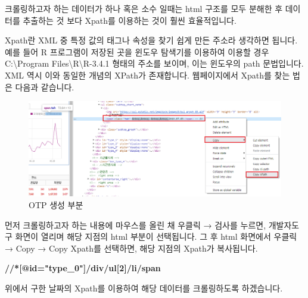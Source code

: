 \documentclass[12pt,]{book}
\newenvironment{Shaded}{\begin{snugshade}}{\end{snugshade}}
\newcommand{\ErrorTok}[1]{\textcolor[rgb]{0.64,0.00,0.00}{\textbf{#1}}}
\begin{document}
크롤링하고자 하는 데이터가 하나 혹은 소수 일때는 html 구조를 모두 분해한 후 데이터를 추출하는 것 보다 Xpath를 이용하는 것이 훨씬 효율적입니다.

Xpath란 XML 중 특정 값의 태그나 속성을 찾기 쉽게 만든 주소라 생각하면 됩니다. 예를 들어 R 프로그램이 저장된 곳을 윈도우 탐색기를 이용하여 이용할 경우 C:\textbackslash{}Program Files\textbackslash{}R\textbackslash{}R-3.4.1 형태의 주소를 보이며, 이는 윈도우의 path 문법입니다. XML 역시 이와 동일한 개념의 XPath가 존재합니다. 웹페이지에서 Xpath를 찾는 법은 다음과 같습니다.

\begin{figure}[h]

{\centering \includegraphics[width=0.7\linewidth]{images/crawl_practice_xpath} 

}

\caption{OTP 생성 부분}\label{fig:unnamed-chunk-13}
\end{figure}

먼저 크롤링하고자 하는 내용에 마우스를 올린 채 우클릭 → 검사를 누르면, 개발자도구 화면이 열리며 해당 지점의 html 부분이 선택됩니다. 그 후 html 화면에서 우클릭 → Copy → Copy Xpath를 선택하면, 해당 지점의 Xpath가 복사됩니다.

\begin{Shaded}
\begin{Highlighting}[]
\ErrorTok{//*[@id="type_0"]/div/ul[2]/li/span}
\end{Highlighting}
\end{Shaded}

위에서 구한 날짜의 Xpath를 이용하여 해당 데이터를 크롤링하도록 하겠습니다.
\end{document}
